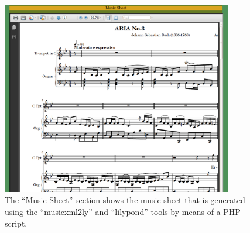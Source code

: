 \documentclass[a4paper, notitlepage]{article}
\begin{document}
\begin{figure}[ht]
\begin{center}
\includegraphics[width=0.9\textwidth]{03-2.png}
\caption{The ``Music Sheet'' section shows the music sheet that is generated using the ``musicxml2ly'' and ``lilypond'' tools by means of a PHP script.}
\label{fig:03-2}
\end{center}
\end{figure}
\end{document}
